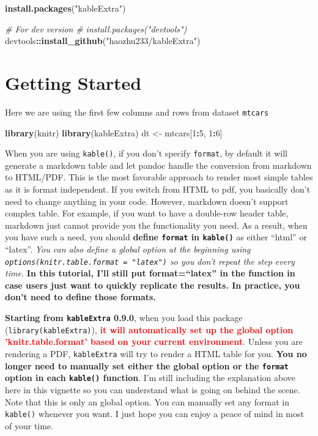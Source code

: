 \documentclass[table]{article}
\newenvironment{Shaded}{\begin{snugshade}}{\end{snugshade}}
\newcommand{\CommentTok}[1]{\textcolor[rgb]{0.56,0.35,0.01}{\textit{#1}}}
\newcommand{\DecValTok}[1]{\textcolor[rgb]{0.00,0.00,0.81}{#1}}
\newcommand{\KeywordTok}[1]{\textcolor[rgb]{0.13,0.29,0.53}{\textbf{#1}}}
\newcommand{\NormalTok}[1]{#1}
\newcommand{\OperatorTok}[1]{\textcolor[rgb]{0.81,0.36,0.00}{\textbf{#1}}}
\newcommand{\StringTok}[1]{\textcolor[rgb]{0.31,0.60,0.02}{#1}}
\begin{document}
\begin{Shaded}
\begin{Highlighting}[]
\KeywordTok{install.packages}\NormalTok{(}\StringTok{"kableExtra"}\NormalTok{)}

\CommentTok{# For dev version}
\CommentTok{# install.packages("devtools")}
\NormalTok{devtools}\OperatorTok{::}\KeywordTok{install_github}\NormalTok{(}\StringTok{"haozhu233/kableExtra"}\NormalTok{)}
\end{Highlighting}
\end{Shaded}

\hypertarget{getting-started}{%
\section{Getting Started}\label{getting-started}}

Here we are using the first few columns and rows from dataset
\texttt{mtcars}

\begin{Shaded}
\begin{Highlighting}[]
\KeywordTok{library}\NormalTok{(knitr)}
\KeywordTok{library}\NormalTok{(kableExtra)}
\NormalTok{dt <-}\StringTok{ }\NormalTok{mtcars[}\DecValTok{1}\OperatorTok{:}\DecValTok{5}\NormalTok{, }\DecValTok{1}\OperatorTok{:}\DecValTok{6}\NormalTok{]}
\end{Highlighting}
\end{Shaded}

When you are using \texttt{kable()}, if you don't specify
\texttt{format}, by default it will generate a markdown table and let
pandoc handle the conversion from markdown to HTML/PDF. This is the most
favorable approach to render most simple tables as it is format
independent. If you switch from HTML to pdf, you basically don't need to
change anything in your code. However, markdown doesn't support complex
table. For example, if you want to have a double-row header table,
markdown just cannot provide you the functionality you need. As a
result, when you have such a need, you should \textbf{define
\texttt{format} in \texttt{kable()}} as either ``html'' or ``latex''.
\emph{You can also define a global option at the beginning using
\texttt{options(knitr.table.format\ =\ "latex")} so you don't repeat the
step every time.} \textbf{In this tutorial, I'll still put
format=``latex'' in the function in case users just want to quickly
replicate the results. In practice, you don't need to define those
formats.}

\textbf{Starting from \texttt{kableExtra} 0.9.0}, when you load this
package (\texttt{library(kableExtra)}),
\textcolor{red}{\textbf{it will automatically set up the global option 'knitr.table.format' based on your current environment}}.
Unless you are rendering a PDF, \texttt{kableExtra} will try to render a
HTML table for you. \textbf{You no longer need to manually set either
the global option or the \texttt{format} option in each \texttt{kable()}
function}. I'm still including the explanation above here in this
vignette so you can understand what is going on behind the scene. Note
that this is only an global option. You can manually set any format in
\texttt{kable()} whenever you want. I just hope you can enjoy a peace of
mind in most of your time.
\end{document}

